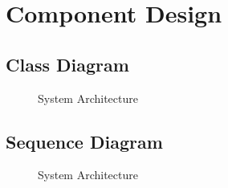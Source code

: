 \documentclass[oneside,a4paper,12pt]{book}
\begin{document}
\section{Component Design} 

\subsection{Class Diagram}
\begin{figure}[!htbp]
    \centering
    {\small \caption{System Architecture}} %
    \label{fig:classdiagram} %
\end{figure}
\newpage


\subsection{Sequence Diagram}
\begin{center}
    \begin{figure}[!htbp]
        \centering
      \caption{System Architecture}
      \label{fig:usecase}
    \end{figure}
\end{center}  
\newpage
\end{document}
